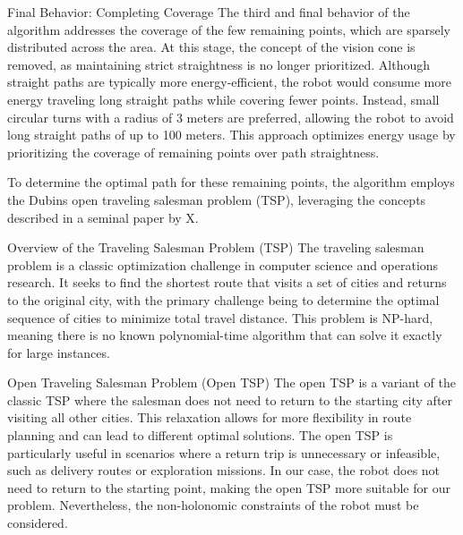 \vspace*{6mm}   

Final Behavior: Completing Coverage
The third and final behavior of the algorithm addresses the coverage of the few remaining points, which are sparsely distributed across the area. At this stage, the concept of the vision cone is removed, as maintaining strict straightness is no longer prioritized. Although straight paths are typically more energy-efficient, the robot would consume more energy traveling long straight paths while covering fewer points. Instead, small circular turns with a radius of 3 meters are preferred, allowing the robot to avoid long straight paths of up to 100 meters. This approach optimizes energy usage by prioritizing the coverage of remaining points over path straightness.

\vspace*{6mm}   

To determine the optimal path for these remaining points, the algorithm employs the Dubins open traveling salesman problem (TSP), leveraging the concepts described in a seminal paper by X.

\vspace*{6mm}   

Overview of the Traveling Salesman Problem (TSP)
The traveling salesman problem is a classic optimization challenge in computer science and operations research. It seeks to find the shortest route that visits a set of cities and returns to the original city, with the primary challenge being to determine the optimal sequence of cities to minimize total travel distance. This problem is NP-hard, meaning there is no known polynomial-time algorithm that can solve it exactly for large instances.

\vspace*{6mm}   

Open Traveling Salesman Problem (Open TSP)
The open TSP is a variant of the classic TSP where the salesman does not need to return to the starting city after visiting all other cities. This relaxation allows for more flexibility in route planning and can lead to different optimal solutions. The open TSP is particularly useful in scenarios where a return trip is unnecessary or infeasible, such as delivery routes or exploration missions. In our case, the robot does not need to return to the starting point, making the open TSP more suitable for our problem. Nevertheless, the non-holonomic constraints of the robot must be considered.

\vspace*{6mm}   

